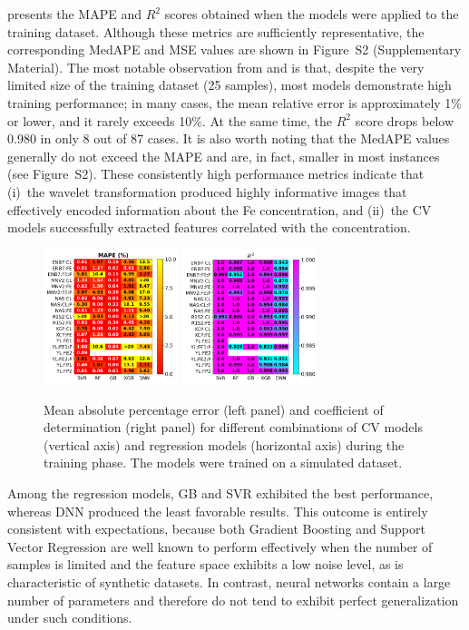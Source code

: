 \documentclass[10pt]{iopart}
\begin{document}
 presents the MAPE and $R^2$ scores obtained when the models were applied to the training dataset.
Although these metrics are sufficiently representative, the corresponding MedAPE and MSE values are shown in Figure~S2 (Supplementary Material).
The most notable observation from  and  is that,
despite the very limited size of the training dataset (25 samples),
most models demonstrate high training performance;
in many cases, the mean relative error is approximately 1\% or lower,
and it rarely exceeds 10\%. At the same time, the $R^2$ score drops below 0.980 in only 8 out of 87 cases.
It is also worth noting that the MedAPE values generally do not exceed the MAPE and are, in fact,
smaller in most instances (see Figure~S2).
These consistently high performance metrics indicate that
(i)~the wavelet transformation produced highly informative images that effectively encoded information about the Fe concentration,
and (ii)~the CV models successfully extracted features correlated with the concentration.

\begin{figure}
\centering
\includegraphics[width=0.35\textwidth]{Fig5a}
\includegraphics[width=0.35\textwidth]{Fig5b}
\caption{
Mean absolute percentage error (left panel) and coefficient of determination (right panel) for different combinations of CV models (vertical axis)
and regression models (horizontal axis) during the training phase. The models were trained on a simulated dataset.
}\label{Fig5}
\end{figure}

Among the regression models, GB and SVR exhibited the best performance,
whereas DNN produced the least favorable results.
This outcome is entirely consistent with expectations,
because both Gradient Boosting and Support Vector Regression are well known to perform effectively
when the number of samples is limited and the feature space exhibits a low noise level, as is characteristic of synthetic datasets.
In contrast, neural networks contain a large number of parameters and therefore do not tend to exhibit perfect generalization under such conditions.
\end{document}
